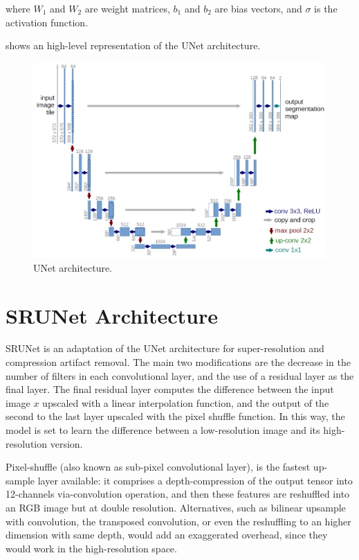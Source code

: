 where $W_1$ and $W_2$ are weight matrices, $b_1$ and $b_2$ are bias vectors, and $\sigma$ is the activation function.

 shows an high-level representation of the UNet architecture.

\begin{figure}[h]
\centering
\includegraphics[width=1.0\textwidth]{static/unet_architecture.png}
\caption{UNet architecture.}
\label{fig:unet}
\end{figure}

\section{SRUNet Architecture}
\label{sec:srunet}

SRUNet is an adaptation of the UNet architecture for super-resolution and compression artifact removal. The main two modifications are the decrease in the number of filters in each convolutional layer, and the use of a residual layer as the final layer.
The final residual layer computes the difference between the input image $x$ upscaled with a linear interpolation function, and the output of the second to the last layer upscaled with the pixel shuffle function. In this way, the model is set to learn the difference between a low-resolution image and its high-resolution version.

Pixel-shuffle (also known as sub-pixel convolutional layer), is the fastest up-sample layer available: it comprises a depth-compression of the output tensor into 12-channels via-convolution operation, and then these features are reshuffled into an RGB image but at double resolution. Alternatives, such as bilinear upsample with convolution, the transposed convolution, or even the reshuffling to an higher dimension with same depth, would add an exaggerated overhead, since they would work in the high-resolution space.

